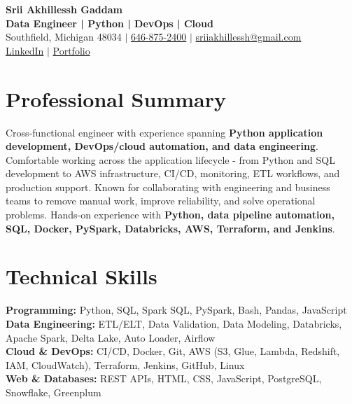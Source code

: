 \documentclass[letterpaper,10pt]{article}
\begin{document}
\fontsize{9.35pt}{10.45pt}\selectfont

\begin{center}
    {\LARGE \textbf{Srii Akhillessh Gaddam}} \\[-1pt]
    \textbf{Data Engineer | Python | DevOps | Cloud} \\[2pt]
    Southfield, Michigan 48034 $|$
    \href{tel:6468752400}{646-875-2400} $|$
    \href{mailto:sriiakhillessh@gmail.com}{sriiakhillessh@gmail.com} \\[1pt]
    \href{https://www.linkedin.com/in/srii-akhiilessh-gaddam-b48668191/}{LinkedIn} $|$
    \href{https://sriiakhillesshg.github.io/portfolio/}{Portfolio}
\end{center}
\vspace{-8pt}

\section{Professional Summary}
\small{Cross-functional engineer with experience spanning \textbf{Python application development, DevOps/cloud automation, and data engineering}. Comfortable working across the application lifecycle - from Python and SQL development to AWS infrastructure, CI/CD, monitoring, ETL workflows, and production support. Known for collaborating with engineering and business teams to remove manual work, improve reliability, and solve operational problems. Hands-on experience with \textbf{Python, data pipeline automation, SQL, Docker, PySpark, Databricks, AWS, Terraform, and Jenkins}.}

\section{Technical Skills}
\small{
\textbf{Programming:} Python, SQL, Spark SQL, PySpark, Bash, Pandas, JavaScript \\
\textbf{Data Engineering:} ETL/ELT, Data Validation, Data Modeling, Databricks, Apache Spark, Delta Lake, Auto Loader, Airflow \\
\textbf{Cloud \& DevOps:} CI/CD, Docker, Git, AWS (S3, Glue, Lambda, Redshift, IAM, CloudWatch), Terraform, Jenkins, GitHub, Linux \\
\textbf{Web \& Databases:} REST APIs, HTML, CSS, JavaScript, PostgreSQL, Snowflake, Greenplum
}

\end{document}
